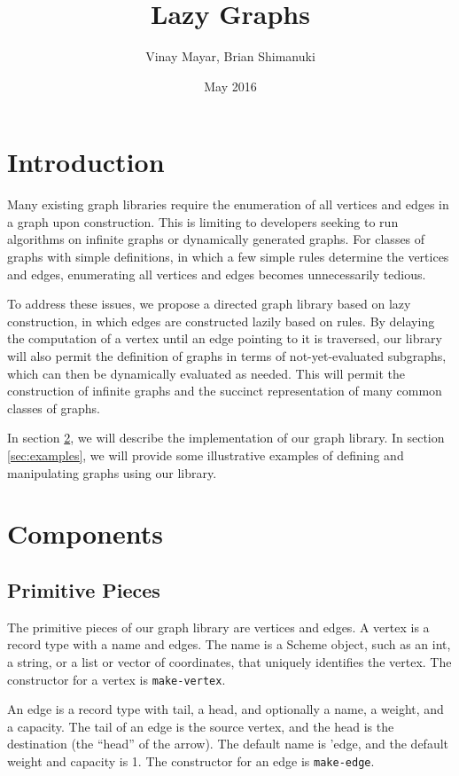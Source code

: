 \documentclass[11pt]{article} %
\title{Lazy Graphs}
\author{Vinay Mayar, Brian Shimanuki}
\date{May 2016}
\theoremstyle{component}
\begin{document}
\maketitle

\section{Introduction}

Many existing graph libraries require the enumeration of all vertices and edges in a graph upon construction.  This is limiting to developers seeking to run algorithms on infinite graphs or dynamically generated graphs.  For classes of graphs with simple definitions, in which a few simple rules determine the vertices and edges, enumerating all vertices and edges becomes unnecessarily tedious.

To address these issues, we propose a directed graph library based on lazy construction, in which edges are constructed lazily based on rules.  By delaying the computation of a vertex until an edge pointing to it is traversed, our library will also permit the definition of graphs in terms of not-yet-evaluated subgraphs, which can then be dynamically evaluated as needed.  This will permit the construction of infinite graphs and the succinct representation of many common classes of graphs.

In section \ref{sec:components}, we will describe the implementation of our graph library.  In section \ref{sec:examples}, we will provide some illustrative examples of defining and manipulating graphs using our library.

\section{Components}
\label{sec:components}

\subsection{Primitive Pieces}

The primitive pieces of our graph library are vertices and edges.  A vertex is a record type with a name and edges.  The name is a Scheme object, such as an int, a string, or a list or vector of coordinates, that uniquely identifies the vertex.  The constructor for a vertex is \verb|make-vertex|. 

An edge is a record type with tail, a head, and optionally a name, a weight, and a capacity.  The tail of an edge is the source vertex, and the head is the destination (the ``head'' of the arrow).  The default name is 'edge, and the default weight and capacity is 1.  The constructor for an edge is \verb|make-edge|.  
\end{document}
